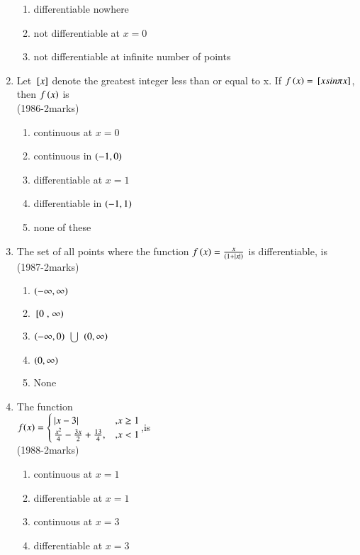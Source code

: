 \documentclass[journal]{IEEEtran}
\numberwithin{equation}{enumi}
\numberwithin{figure}{enumi}
\begin{document}
\begin{enumerate}
\begin{enumerate}
			\item differentiable nowhere 
			\item not differentiable at $x=0$
			\item not differentiable at infinite number of points \\
		\end{enumerate}
	\item Let ${}\left[x\right]$ denote the greatest integer less than or equal to x. If $f\left(x\right)={}\left[xsin \pi x\right]$, then $f\left(x\right)$ is \\ \hfill{(1986-2marks)}
		\begin{enumerate}
			\item continuous at $x=0$
			\item continuous in $\left(-1,0\right)$
			\item differentiable at $x=1$ 
			\item differentiable in $\left(-1,1\right)$ 
			\item none of these \\
		\end{enumerate}
	\item The set of all points where the function $f\left(x\right)=\frac{x}{(1+\left\vert x\right\vert)}$ is differentiable, is \\ \hfill{(1987-2marks)}
		\begin{enumerate}
			\item $\left(- \infty, \infty\right)$
			\item ${}\left[0\right., \left.\infty\right)$
			\item $\left(- \infty,0\right)$ $\bigcup$ $\left(0, \infty\right)$
			\item $\left(0, \infty\right)$
			\item None \\
		\end{enumerate}
	\item The function \\ $f(x)=\begin{cases}\left\vert x-3\right\vert & \text{,} x \geq 1 \\ \frac{x^2}{4}-\frac{3x}{2}+\frac{13}{4}, & \text{,} x<1 \end{cases}$,is \\ \hfill{(1988-2marks)}
			\begin{enumerate}
				\item continuous at $x=1$
				\item differentiable at $x=1$
				\item continuous at $x=3$
				\item differentiable at $x=3$ \\

\end{enumerate}
\end{enumerate}
\end{document}
